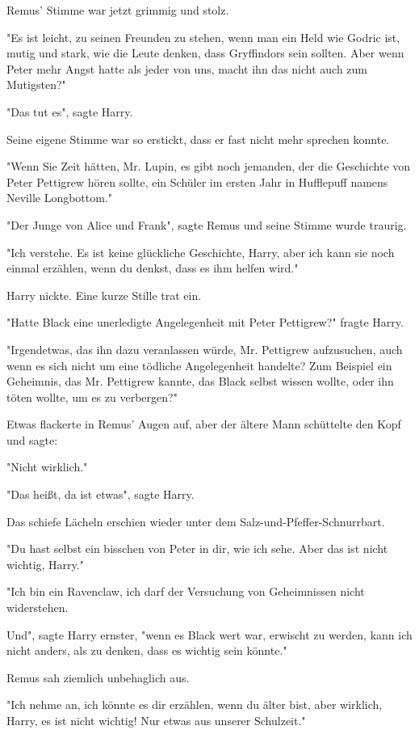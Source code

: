 {Remus' Stimme war jetzt grimmig und stolz.

"Es ist leicht, zu seinen Freunden zu stehen, wenn man ein Held wie Godric ist, mutig und stark, wie die Leute denken, dass Gryffindors sein sollten. Aber wenn Peter mehr Angst hatte als jeder von uns, macht ihn das nicht auch zum Mutigsten?"

"Das tut es", sagte Harry.

Seine eigene Stimme war so erstickt, dass er fast nicht mehr sprechen konnte.

"Wenn Sie Zeit hätten, Mr. Lupin, es gibt noch jemanden, der die Geschichte von Peter Pettigrew hören sollte, ein Schüler im ersten Jahr in Hufflepuff namens Neville Longbottom."

"Der Junge von Alice und Frank", sagte Remus und seine Stimme wurde traurig.

"Ich verstehe. Es ist keine glückliche Geschichte, Harry, aber ich kann sie noch einmal erzählen, wenn du denkst, dass es ihm helfen wird."

Harry nickte. Eine kurze Stille trat ein.

"Hatte Black eine unerledigte Angelegenheit mit Peter Pettigrew?" fragte Harry.

"Irgendetwas, das ihn dazu veranlassen würde, Mr. Pettigrew aufzusuchen, auch wenn es sich nicht um eine tödliche Angelegenheit handelte? Zum Beispiel ein Geheimnis, das Mr. Pettigrew kannte, das Black selbst wissen wollte, oder ihn töten wollte, um es zu verbergen?"

Etwas flackerte in Remus' Augen auf, aber der ältere Mann schüttelte den Kopf und sagte:

"Nicht wirklich."

"Das heißt, da ist etwas", sagte Harry.

Das schiefe Lächeln erschien wieder unter dem Salz-und-Pfeffer-Schnurrbart.

"Du hast selbst ein bisschen von Peter in dir, wie ich sehe. Aber das ist nicht wichtig, Harry."

"Ich bin ein Ravenclaw, ich darf der Versuchung von Geheimnissen nicht widerstehen.

Und", sagte Harry ernster, "wenn es Black wert war, erwischt zu werden, kann ich nicht anders, als zu denken, dass es wichtig sein könnte."

Remus sah ziemlich unbehaglich aus.

"Ich nehme an, ich könnte es dir erzählen, wenn du älter bist, aber wirklich, Harry, es ist nicht wichtig! Nur etwas aus unserer Schulzeit."

}
